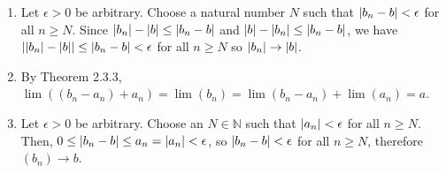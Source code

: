 \documentclass{article}
\DeclarePairedDelimiter\abs{\lvert}{\rvert}
\newcommand{\N}{\mathbb{N}}
\begin{document}
\begin{enumerate}
\begin{enumerate}
		\item Let $\epsilon > 0$ be arbitrary. Choose a natural number $N$ such that $\abs*{b_n - b} < \epsilon$ for all $n \geq N$. Since $\abs*{b_n} - \abs*{b} \leq \abs*{b_n - b}$ and $\abs*{b} - \abs*{b_n} \leq \abs*{b_n - b}$, we have $\abs*{\abs*{b_n}-\abs*{b}} \leq \abs*{b_n-b} < \epsilon$ for all $n \geq N$ so $\abs*{b_n} \rightarrow \abs*{b}$.
		      		      		      	     
		\item By Theorem 2.3.3, $\lim ((b_n-a_n) + a_n) = \lim(b_n) = \lim (b_n - a_n) + \lim(a_n) = a$.
		      		      		      	     
		\item Let $\epsilon > 0$ be arbitrary. Choose an $N \in \N$ such that $\abs*{a_n} < \epsilon$ for all $n \geq N$. Then, $0 \leq \abs*{b_n-b} \leq a_n = \abs*{a_n} < \epsilon$, so $\abs*{b_n - b} < \epsilon$ for all $n \geq N$, therefore $(b_n) \rightarrow b$.
	\end{enumerate}
				 

\end{enumerate}
\end{document}
